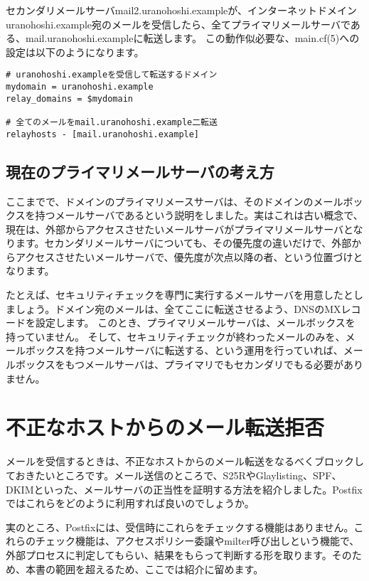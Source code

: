 セカンダリメールサーバmail2.uranohoshi.exampleが、インターネットドメインuranohoshi.example宛のメールを受信したら、全てプライマリメールサーバである、mail.uranohoshi.exampleに転送します。
この動作似必要な、main.cf(5)への設定は以下のようになります。

\begin{lstlisting}[basicstyle=\ttfamily\footnotesize, frame=single]
# uranohoshi.exampleを受信して転送するドメイン
mydomain = uranohoshi.example
relay_domains = $mydomain

# 全てのメールをmail.uranohoshi.example二転送
relayhosts - [mail.uranohoshi.example]
\end{lstlisting}

\subsection{現在のプライマリメールサーバの考え方}

ここまでで、ドメインのプライマリメースサーバは、そのドメインのメールボックスを持つメールサーバであるという説明をしました。実はこれは古い概念で、現在は、外部からアクセスさせたいメールサーバがプライマリメールサーバとなります。セカンダリメールサーバについても、その優先度の違いだけで、外部からアクセスさせたいメールサーバで、優先度が次点以降の者、という位置づけとなります。

たとえば、セキュリティチェックを専門に実行するメールサーバを用意したとしましょう。ドメイン宛のメールは、全てここに転送させるよう、DNSのMXレコードを設定します。
このとき、プライマリメールサーバは、メールボックスを持っていません。
そして、セキュリティチェックが終わったメールのみを、メールボックスを持つメールサーバに転送する、という運用を行っていれば、メールボックスをもつメールサーバは、プライマリでもセカンダリでもる必要がありません。


\section{不正なホストからのメール転送拒否}

メールを受信するときは、不正なホストからのメール転送をなるべくブロックしておきたいところです。メール送信のところで、S25RやGlaylisting、SPF、DKIMといった、メールサーバの正当性を証明する方法を紹介しました。Postfixではこれらをどのように利用すれば良いのでしょうか。

実のところ、Postfixには、受信時にこれらをチェックする機能はありません。これらのチェック機能は、アクセスポリシー委譲やmilter呼び出しという機能で、外部プロセスに判定してもらい、結果をもらって判断する形を取ります。そのため、本書の範囲を超えるため、ここでは紹介に留めます。


